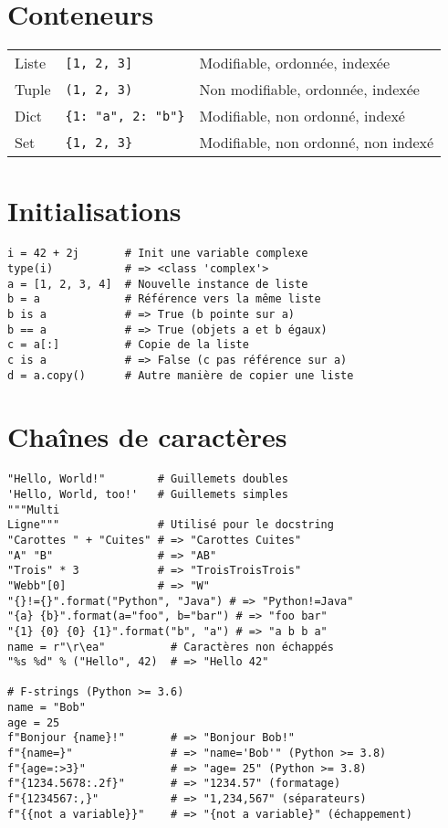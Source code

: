 \documentclass{article}
\begin{document}
\begin{multicols*}{4}
\section*{Conteneurs}

\begin{tabularx}{\columnwidth}{llX}
Liste & \texttt{[1, 2, 3]} & Modifiable, ordonnée, indexée \\
Tuple & \texttt{(1, 2, 3)} & Non modifiable, ordonnée, indexée \\
Dict & \texttt{\{1: "a", 2: "b"\}} & Modifiable, non ordonné, indexé \\
Set & \texttt{\{1, 2, 3\}} & Modifiable, non ordonné, non indexé \\

\end{tabularx}

\section*{Initialisations}

\begin{lstlisting}
i = 42 + 2j       # Init une variable complexe
type(i)           # => <class 'complex'>
a = [1, 2, 3, 4]  # Nouvelle instance de liste
b = a             # Référence vers la même liste
b is a            # => True (b pointe sur a)
b == a            # => True (objets a et b égaux)
c = a[:]          # Copie de la liste
c is a            # => False (c pas référence sur a)
d = a.copy()      # Autre manière de copier une liste
\end{lstlisting}

\section*{Chaînes de caractères}

\begin{lstlisting}
"Hello, World!"        # Guillemets doubles
'Hello, World, too!'   # Guillemets simples
"""Multi
Ligne"""               # Utilisé pour le docstring
"Carottes " + "Cuites" # => "Carottes Cuites"
"A" "B"                # => "AB"
"Trois" * 3            # => "TroisTroisTrois"
"Webb"[0]              # => "W"
"{}!={}".format("Python", "Java") # => "Python!=Java"
"{a} {b}".format(a="foo", b="bar") # => "foo bar"
"{1} {0} {0} {1}".format("b", "a") # => "a b b a"
name = r"\r\ea"          # Caractères non échappés
"%s %d" % ("Hello", 42)  # => "Hello 42"

# F-strings (Python >= 3.6)
name = "Bob"
age = 25
f"Bonjour {name}!"       # => "Bonjour Bob!"
f"{name=}"               # => "name='Bob'" (Python >= 3.8)
f"{age=:>3}"             # => "age= 25" (Python >= 3.8)
f"{1234.5678:.2f}"       # => "1234.57" (formatage)
f"{1234567:,}"           # => "1,234,567" (séparateurs)
f"{{not a variable}}"    # => "{not a variable}" (échappement)


\end{lstlisting}
\end{multicols*}
\end{document}
